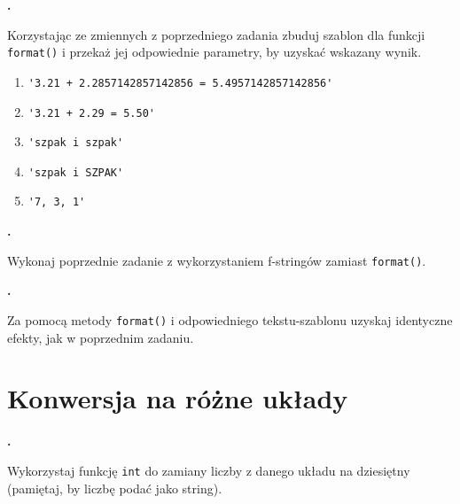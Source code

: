 \documentclass[a4paper]{article}
\begin{document}
\textbf{.}\addtocounter{zadanie}{1} Korzystając ze zmiennych z poprzedniego zadania zbuduj szablon dla funkcji \verb|format()| i przekaż jej odpowiednie parametry, by uzyskać wskazany wynik.

\begin{enumerate}[label=\arabic*.]
    \item \verb|'3.21 + 2.2857142857142856 = 5.4957142857142856'|
    \item \verb|'3.21 + 2.29 = 5.50'|
    \item \verb|'szpak i szpak'|
    \item \verb|'szpak i SZPAK'|
    \item \verb|'7, 3, 1'|

\end{enumerate}

\textbf{.}\addtocounter{zadanie}{1} Wykonaj poprzednie zadanie z wykorzystaniem f-stringów zamiast \verb|format()|.



\textbf{.}\addtocounter{zadanie}{1}
Za pomocą metody \verb|format()| i odpowiedniego tekstu-szablonu uzyskaj identyczne efekty, jak w poprzednim zadaniu.


\section{Konwersja na różne układy}

\textbf{.}\addtocounter{zadanie}{1} Wykorzystaj funkcję \verb|int| do zamiany liczby z danego układu na dziesiętny (pamiętaj, by liczbę podać jako string).
\end{document}
